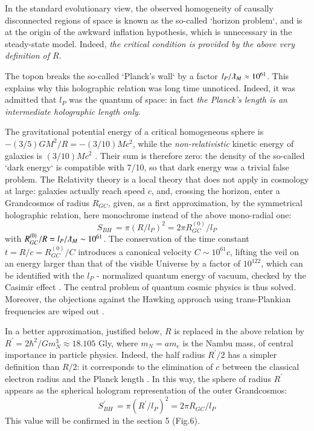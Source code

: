 \documentclass[twoside,draft]{article}
\begin{document}
\begin{sloppypar}
In the standard evolutionary view, the observed homogeneity of causally disconnected regions of space is known as the so-called `horizon problem`, and is at the origin of the awkward inflation hypothesis, which is unnecessary in the steady-state model. Indeed, \textit{the critical condition is provided by the above very definition of $R$}.

The topon breaks the so-called `Planck's wall` by a factor $l_{P}/\lambdabar_{M}\approx 10^{61}$. This explains why this holographic relation was long time unnoticed. Indeed, it was admitted that $l_{P}$ was the quantum of space: in fact \textit{the Planck's length is an intermediate holographic length only}.

The gravitational potential energy of a critical homogeneous sphere is $-(3/5)GM^{2}/R = -
(3/10)Mc^{2}$, while the \textit{non-relativistic} kinetic energy of galaxies is $(3/10)Mc^{2}$ \cite{Sanchez1}. Their sum is therefore zero: the density of the so-called `dark energy` is compatible with 7/10, so that dark energy was a trivial false problem. 
The Relativity theory is a local theory that does not apply in cosmology at large: 
galaxies actually reach speed $c$, and, crossing the horizon, enter a Grandcosmos of radius $R_{GC}$, given, as a first approximation, by the symmetrical holographic relation, here monochrome instead of the above mono-radial one:
\begin{equation}
S_{BH}\, = \pi(R/l_P )^{2} = 2\pi R^{(0)}_{GC} /l_{P}
\end{equation}
with $R^{(0)}_{GC} /R = l_{P} /\lambdabar_{M} \sim 10^{61}$. 
The conservation of the time constant $t = R/c = R^{(0)}_{GC} /C$ introduces a canonical velocity $C \sim 10^{61} c$, 
lifting the veil on an energy larger than that of the visible Universe by a factor of $10^{122}$, which can be identified with the $l_{P}$ - normalized quantum energy of vacuum, checked by the Casimir effect \cite{Duplantier}. The central problem of quantum cosmic physics is thus solved. Moreover, the objections against the Hawking approach using trans-Plankian frequencies are wiped out \cite{Damour}.

In a better approximation, justified below, $R$ is replaced in the above relation by $R^{\prime} = 2\hbar^{2}/Gm_{N}^{3}
\approx 18.105$ Gly, where $m_{N} = am_{e}$ is the Nambu mass\cite{Nambu}, of central importance in particle physics. Indeed, the half radius $R^{\prime}/2$ has a simpler definition than $R/2$: it corresponds to the elimination of $c$ between the classical electron radius and the Planck length \cite{Sanchez1}. In this way, the sphere of radius $R^{\prime}$ appears 
as the spherical hologram representation of the outer Grandcosmos:
\begin{equation}
S^{\prime}_{BH}\, = \pi(R^{\prime}/l_{P})^{2} = 2\pi R_{GC} /l_{P}
\end{equation}
This value will be confirmed in the section 5 (Fig.6).


\end{sloppypar}
\end{document}
